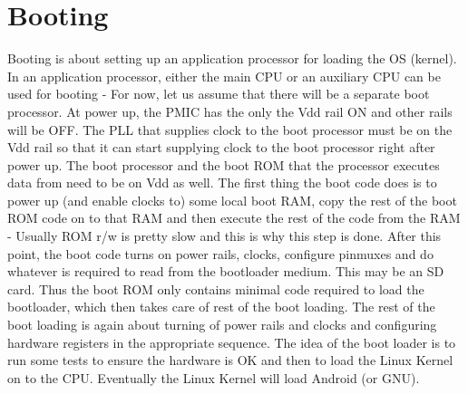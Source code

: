 \section{Booting}
Booting is about setting up an application processor for loading the OS (kernel). In an application processor, either the main CPU or an auxiliary CPU can be used for booting - For now, let us assume that there will be a separate boot processor. At power up, the PMIC has the only the Vdd rail ON and other rails will be OFF. The PLL that supplies clock to the boot processor must be on the Vdd rail so that it can start supplying clock to the boot processor right after power up. The boot processor and the boot ROM that the processor executes data from need to be on Vdd as well. The first thing the boot code does is to power up (and enable clocks to) some local boot RAM, copy the rest of the boot ROM code on to that RAM and then execute the rest of the code from the RAM - Usually ROM r/w is pretty slow and this is why this step is done. After this point, the boot code turns on power rails, clocks, configure pinmuxes and do whatever is required to read from the bootloader medium. This may be an SD card. Thus the boot ROM only contains minimal code required to load the bootloader, which then takes care of rest of the boot loading. The rest of the boot loading is again about turning of power rails and clocks and configuring hardware registers in the appropriate sequence. The idea of the boot loader is to run some tests to ensure the hardware is OK and then to load the Linux Kernel on to the CPU. Eventually the Linux Kernel will load Android (or GNU). 


























